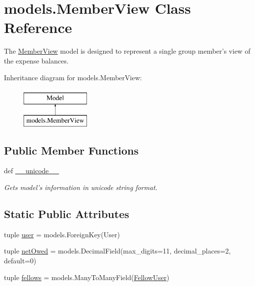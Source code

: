 \hypertarget{classmodels_1_1_member_view}{\section{models.\-Member\-View Class Reference}
\label{classmodels_1_1_member_view}
}


The \hyperlink{classmodels_1_1_member_view}{Member\-View} model is designed to represent a single group member's view of the expense balances.  


Inheritance diagram for models.\-Member\-View\-:\begin{figure}[H]
\begin{center}
\leavevmode
\includegraphics[height=2.000000cm]{classmodels_1_1_member_view}
\end{center}
\end{figure}
\subsection*{Public Member Functions}
\begin{DoxyCompactItemize}
\item 
def \hyperlink{classmodels_1_1_member_view_a362c56c6f6e39dfb3beafd1dd6b9896e}{\-\_\-\-\_\-unicode\-\_\-\-\_\-}
\begin{DoxyCompactList}\small\item\em Gets model's information in unicode string format. \end{DoxyCompactList}\end{DoxyCompactItemize}
\subsection*{Static Public Attributes}
\begin{DoxyCompactItemize}
\item 
tuple \hyperlink{classmodels_1_1_member_view_abb93f3b6aa9cac36c799e0efa49783ff}{user} = models.\-Foreign\-Key(User)
\item 
tuple \hyperlink{classmodels_1_1_member_view_ad008581ab482be3c68ab8b40abfd0fb4}{net\-Owed} = models.\-Decimal\-Field(max\-\_\-digits=11, decimal\-\_\-places=2, default=0)
\item 
tuple \hyperlink{classmodels_1_1_member_view_a021cf8a6e0c3a9fe4d7595fecf7d9d6d}{fellows} = models.\-Many\-To\-Many\-Field(\hyperlink{classmodels_1_1_fellow_user}{Fellow\-User})
\end{DoxyCompactItemize}



